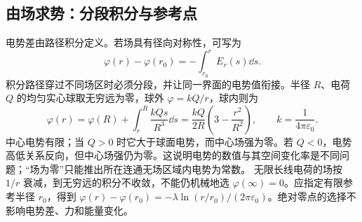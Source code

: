 \subsection{由场求势：分段积分与参考点}
电势差由路径积分定义。若场具有径向对称性，可写为
\[
 \varphi(r)-\varphi(r_0)=-\int_{r_0}^{r}E_r(s)\dd s.
\]
积分路径穿过不同场区时必须分段，并让同一界面的电势值衔接。半径 $R$、电荷 $Q$ 的均匀实心球取无穷远为零，球外 $\varphi=kQ/r$，球内则为
\[
 \varphi(r)=\varphi(R)+\int_r^R\frac{kQs}{R^3}\dd s
 =\frac{kQ}{2R}\left(3-\frac{r^2}{R^2}\right),\qquad k=\frac1{4\pi\varepsilon_0}.
\]
中心电势有限；当 $Q>0$ 时它大于球面电势，而中心场强为零。若 $Q<0$，电势高低关系反向，但中心场强仍为零。这说明电势的数值与其空间变化率是不同问题；“场为零”只能推出所在连通无场区域内电势为常数。
无限长线电荷的场按 $1/r$ 衰减，到无穷远的积分不收敛，不能仍机械地选 $\varphi(\infty)=0$。应指定有限参考半径 $r_0$，得到
$\varphi(r)-\varphi(r_0)=-\lambda\ln(r/r_0)/(2\pi\varepsilon_0)$。绝对零点的选择不影响电势差、力和能量变化。

